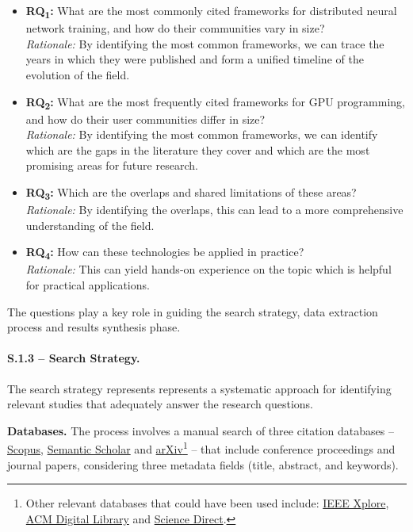 \label{sec:research_questions_refined}
\begin{itemize}
	\item \textbf{RQ\textsubscript{1}:} What are the most commonly cited
	      frameworks for distributed neural network training, and how do their communities vary in size? \\
	      \textit{Rationale:} By identifying the most common frameworks, we can trace the years in which they were published
	      and form a unified timeline of the evolution of the field.

	\item \textbf{RQ\textsubscript{2}:} What are the most frequently cited
	      frameworks for GPU programming, and how do their user communities differ in size?\\
	      \textit{Rationale:} By identifying the most common frameworks, we can identify which are the gaps
	      in the literature they cover and which are the most promising areas for future research.

	\item \textbf{RQ\textsubscript{3}:} Which are the overlaps and shared limitations of these areas? \\
	      \textit{Rationale:} By identifying the overlaps, this can lead to a more comprehensive understanding of the field.

	\item \textbf{RQ\textsubscript{4}:} How can these technologies be applied in practice? \\
	      \textit{Rationale:} This can yield hands-on experience on the topic which is helpful for practical applications.

\end{itemize}


The questions play a key role in guiding the search strategy, data extraction process and results
synthesis phase.

\paragraph{S.1.3 -- Search Strategy.}
The search strategy represents represents a systematic approach for identifying relevant studies
that adequately answer the research questions.

\textbf{Databases.}
The process involves a manual search of three citation databases --
\href{https://www.scopus.com/}{Scopus}, \href{https://www.semanticscholar.org/}{Semantic Scholar}
and \href{https://arxiv.org/}{arXiv}\footnote{Other relevant databases that could have been used
	include: \href{https://ieeexplore.ieee.org/}{IEEE Xplore}, \href{https://dl.acm.org/}{ACM Digital
		Library} and \href{https://www.sciencedirect.com/}{Science Direct}.} -- that include conference
proceedings and journal papers, considering three metadata fields (title, abstract, and keywords).

